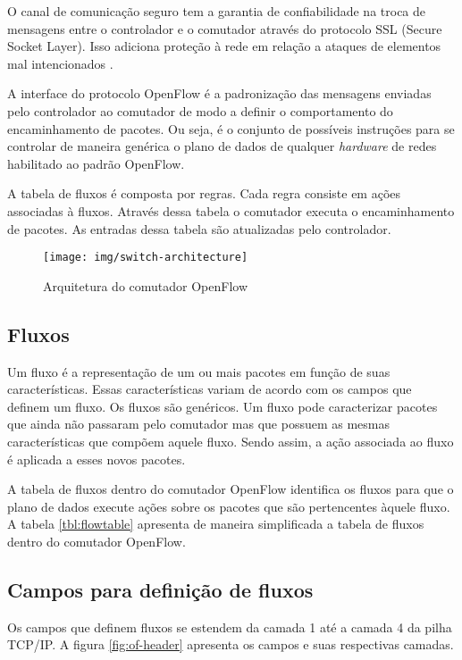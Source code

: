 O canal de comunicação seguro tem a garantia de confiabilidade na troca
de mensagens entre o controlador e o comutador através do protocolo SSL
(Secure Socket Layer).
Isso adiciona proteção à rede em relação a ataques de elementos mal
intencionados \citep{rothenberg2010openflow}.

A interface do protocolo OpenFlow é a padronização das mensagens enviadas
pelo controlador ao comutador de modo a definir o comportamento do encaminhamento
de pacotes.
Ou seja, é o conjunto de possíveis instruções para se controlar de maneira
genérica o plano de dados de qualquer \emph{hardware} de redes habilitado
ao padrão OpenFlow.

A tabela de fluxos é composta por regras.
Cada regra consiste em ações associadas à fluxos.
Através dessa tabela o comutador executa o encaminhamento de pacotes.
As entradas dessa tabela são atualizadas pelo controlador.

\begin{figure}[h!]
    \centering
    \label{fig:switch-arch}
    \texttt{[image: img/switch-architecture]}
    \caption{Arquitetura do comutador OpenFlow}
\end{figure}


\subsection{Fluxos}

Um fluxo é a representação de um ou mais pacotes em função de suas
características.
Essas características variam de acordo com os campos que definem um fluxo.
Os fluxos são genéricos.
Um fluxo pode caracterizar pacotes que ainda não passaram pelo comutador mas
que possuem as mesmas características que compõem aquele fluxo.
Sendo assim, a ação associada ao fluxo é aplicada a esses novos pacotes.




A tabela de fluxos dentro do comutador OpenFlow identifica os fluxos para que o
plano de dados execute ações sobre os pacotes que são pertencentes àquele
fluxo.
A tabela \ref{tbl:flowtable} apresenta de maneira simplificada a tabela
de fluxos dentro do comutador OpenFlow.

\subsection{Campos para definição de fluxos}

Os campos que definem fluxos se estendem da camada 1 até a camada 4 da
pilha TCP/IP.
A figura \ref{fig:of-header} apresenta os campos e suas respectivas camadas.

